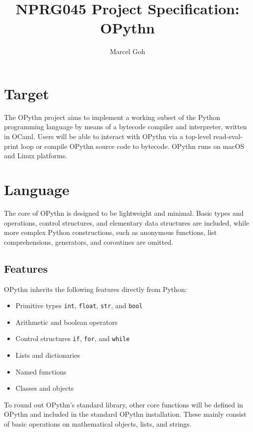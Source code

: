 \documentclass[11pt, A4, twoside]{article}
\newcommand{\ms}{\texttt}
\begin{document}
\title{\Huge{\textbf{NPRG045 Project Specification: OPythn}}}
\author{\Large{Marcel Goh}}
\clearpage\maketitle
\thispagestyle{empty}
\newpage
\setcounter{page}{1}

\section{Target}
    The OPythn project aims to implement a working subset of the Python programming language by means of a bytecode compiler and interpreter, written in OCaml. Users will be able to interact with OPythn via a top-level read-eval-print loop or compile OPythn source code to bytecode. OPythn runs on macOS and Linux platforms.

\section{Language}
    The core of OPythn is designed to be lightweight and minimal. Basic types and operations, control structures, and elementary data structures are included, while more complex Python constructions, such as anonymous functions, list comprehensions, generators, and coroutines are omitted.
    \subsection{Features}
    OPythn inherits the following features directly from Python:
    \begin{itemize}
        \item Primitive types \ms{int}, \ms{float}, \ms{str}, and \ms{bool}
        \item Arithmetic and boolean operators
        \item Control structures \ms{if}, \ms{for}, and \ms{while}
        \item Lists and dictionaries
        \item Named functions
        \item Classes and objects
    \end{itemize}
    To round out OPythn's standard library, other core functions will be defined in OPythn and included in the standard OPythn installation. These mainly consist of basic operations on mathematical objects, lists, and strings.
\end{document}
